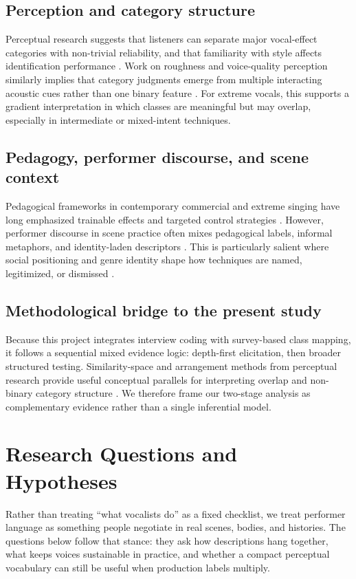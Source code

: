 \documentclass{article}
\begin{document}
\subsection{Perception and category structure}
Perceptual research suggests that listeners can separate major vocal-effect categories with non-trivial reliability, and that familiarity with style affects identification performance \parencite{Pinto2023VocalEffects}.
Work on roughness and voice-quality perception similarly implies that category judgments emerge from multiple interacting acoustic cues rather than one binary feature \parencite{Anikin2025AcousticRoughness,blomgren1998vocalfry}.
For extreme vocals, this supports a gradient interpretation in which classes are meaningful but may overlap, especially in intermediate or mixed-intent techniques.

\subsection{Pedagogy, performer discourse, and scene context}
Pedagogical frameworks in contemporary commercial and extreme singing have long emphasized trainable effects and targeted control strategies \parencite{sadolin2000complete,sadolin2012effects}.
However, performer discourse in scene practice often mixes pedagogical labels, informal metaphors, and identity-laden descriptors \parencite{Ribaldini2019Terminology,Herbst2017VoiceOfAnarchy}.
This is particularly salient where social positioning and genre identity shape how techniques are named, legitimized, or dismissed \parencite{Wallmark2018SoundOfEvil,Sharman2015AngerProcessing}.

\subsection{Methodological bridge to the present study}
Because this project integrates interview coding with survey-based class mapping, it follows a sequential mixed evidence logic: depth-first elicitation, then broader structured testing.
Similarity-space and arrangement methods from perceptual research provide useful conceptual parallels for interpreting overlap and non-binary category structure \parencite{Hout2013,Blanchard2016FreeSorting,Kriegeskorte2012InverseMDS,Shepard1962,Kruskal1964,BorgGroenen2005,Navarro2010}.
We therefore frame our two-stage analysis as complementary evidence rather than a single inferential model.

\section{Research Questions and Hypotheses}
Rather than treating ``what vocalists do'' as a fixed checklist, we treat performer language as something people negotiate in real scenes, bodies, and histories.
The questions below follow that stance: they ask how descriptions hang together, what keeps voices sustainable in practice, and whether a compact perceptual vocabulary can still be useful when production labels multiply.
\end{document}
